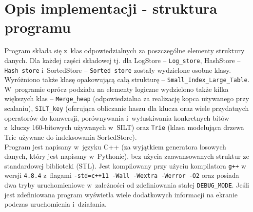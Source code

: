 \documentclass[declaration,shortabstract,masc]{iithesis}
\begin{document}
		\section{Opis implementacji - struktura programu}
			Program składa się z~klas odpowiedzialnych za poszczególne elementy struktury danych. Dla każdej części składowej tj. dla LogStore -- \texttt{Log\_store}, HashStore -- \texttt{Hash\_store} i~SortedStore -- \texttt{Sorted\_store} zostały wydzielone osobne klasy. Wyróżniono także klasę opakowującą całą strukturę -- \texttt{Small\_Index\_Large\_Table}.\\
			\indent W~programie oprócz podziału na elementy logiczne wydzielono także kilka większych klas -- \texttt{Merge\_heap} (odpowiedzialna za realizację kopca używanego przy scalaniu), \texttt{SILT\_key} (oferująca obliczanie haszu dla klucza oraz wiele przydatnych operatorów do konwersji, porównywania i~wyłuskiwania konkretnych bitów z~kluczy 160-bitowych używanych w~SILT) oraz \texttt{Trie} (klasa modelująca drzewa Trie używane do indeksowania SortedStore).\\
			\indent Program jest napisany w~języku C++ (za wyjątkiem generatora losowych danych, który jest napisany w~Pythonie), bez użycia zaawansowanych struktur ze standardowej biblioteki (STL). Jest kompilowany przy użyciu kompilatora \texttt{g++} w wersji \texttt{4.8.4} z~flagami \texttt{-std=c++11 -Wall -Wextra -Werror -O2} oraz posiada dwa tryby uruchomieniowe w~zależności od zdefiniowania stałej \texttt{DEBUG\_MODE}. Jeśli jest zdefiniowana program wyświetla wiele dodatkowych informacji na ekranie podczas uruchomienia i~działania.
\end{document}
